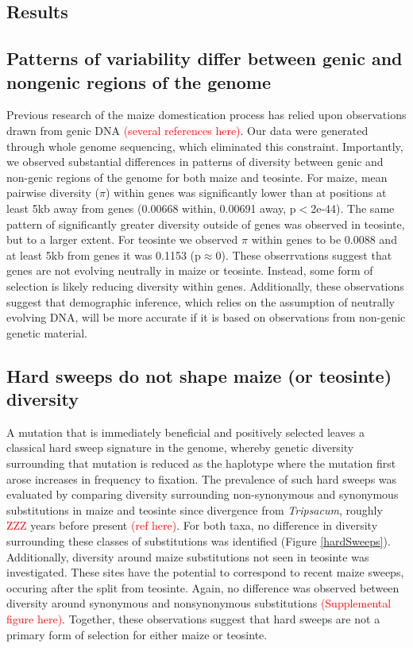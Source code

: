 \documentclass{pnastwo}
\begin{document}
\begin{article}
\section{Results}
\subsection{Patterns of variability differ between genic and
  nongenic regions of the genome}
Previous research of the maize domestication process has relied upon
observations drawn from genic DNA \textcolor{red}{(several references
  here)}. Our data were generated through whole genome sequencing,
which eliminated this constraint. Importantly, we observed substantial
differences in patterns of diversity between genic and non-genic regions
of the genome for both maize and teosinte. For maize, mean pairwise
diversity ($\pi$) within genes was significantly lower than at
positions at least 5kb away from genes (0.00668 within, 0.00691 away, p$<$2e-44). The same
pattern of significantly greater diversity outside of genes was observed in
teosinte, but to a larger extent. For teosinte we observed $\pi$
within genes to be 0.0088 and at least 5kb from genes it was 0.1153
(p$\approx$0). These obserrvations suggest that genes are not evolving
neutrally in maize or teosinte. Instead, some form of selection is likely
reducing diversity within genes. Additionally, these observations
suggest that demographic inference, which relies on the assumption of
neutrally evolving DNA, will be more accurate if it is based on
observations from non-genic genetic material.

\subsection{Hard sweeps do not shape maize (or teosinte) diversity}
A mutation that is immediately beneficial and positively selected leaves a classical hard
sweep signature in the genome, whereby genetic diversity surrounding
that mutation is reduced as the haplotype where the mutation first
arose increases in frequency to fixation. The prevalence of such hard
sweeps was evaluated by comparing diversity
surrounding non-synonymous and synonymous substitutions in maize and
teosinte since divergence from \emph{Tripsacum}, roughly \textcolor{red}{ZZZ} years before
present \textcolor{red}{(ref here)}. For both taxa, no difference in diversity
surrounding these classes of substitutions was identified (Figure
\ref{hardSweeps}). Additionally, diversity around maize substitutions
not seen in teosinte was investigated. These sites have the potential
to correspond to recent maize sweeps, occuring after the split from
teosinte. Again, no difference was observed between diversity around
synonymous and nonsynonymous substitutions
\textcolor{red}{(Supplemental figure here)}. Together, these
observations suggest that hard sweeps are not a primary form of
selection for either maize or teosinte.


\end{article}
\end{document}
